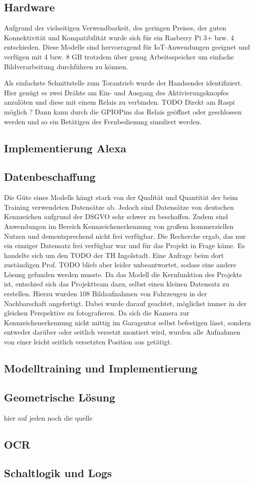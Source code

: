 \subsection{Hardware}
Aufgrund der vielseitigen Verwendbarkeit, des geringen Preises, der guten Konnektivität und Kompatibilität wurde sich für ein Rasberry Pi 3+ bzw. 4 entschieden. Diese Modelle sind hervorragend für IoT-Anwendungen geeignet und verfügen mit 4 bzw. 8 GB trotzdem über genug Arbeitsspeicher um einfache Bildverarbeitung durchführen zu können. 

Als einfachste Schnittstelle zum Torantrieb wurde der Handsender identifiziert. Hier genügt es zwei Drähte am Ein- und Ausgang des Aktivierungsknopfes anzulöten und diese mit einem Relais zu verbinden. TODO Direkt am Raspi möglich ? Dann kann durch die \ac{GPIO}Pins das Relais geöffnet oder geschlossen werden und so ein Betätigen der Fernbedienung simuliert werden.


\subsection{Implementierung Alexa}





\subsection{Datenbeschaffung}
Die Güte eines Modells hängt stark von der Qualität und Quantität der beim Training verwendeten Datensätze ab. Jedoch sind Datensätze von deutschen Kennzeichen aufgrund der \ac{DSGVO} sehr schwer zu beschaffen. Zudem sind Anwendungen im Bereich Kennzeichenerkennung von großem kommerziellen Nutzen und dementsprechend nicht frei verfügbar. Die Recherche ergab, das nur ein einziger Datensatz frei verfügbar war und für das Projekt in Frage käme. Es handelte sich um den TODO der TH Ingolstadt. Eine Anfrage beim dort zuständigen Prof. TODO blieb aber leider unbeantwortet, sodass eine andere Lösung gefunden werden musste.
Da das Modell die Kernfunktion des Projekts ist, entschied sich das Projektteam dazu, selbst einen kleinen Datensatz zu erstellen. 
Hierzu wurden 108 Bildaufnahmen von Fahrzeugen in der Nachbarschaft angefertigt. Dabei wurde darauf geachtet, möglichst immer in der gleichen Perspektive zu fotografieren. Da sich die Kamera zur Kennzeichenerkennung nicht mittig im Garagentor selbst befestigen lässt, sondern entweder darüber oder seitlich versetzt montiert wird, wurden alle Aufnahmen von einer leicht seitlich versetzten Position aus getätigt.

\subsection{Modelltraining und Implementierung}

\subsection{Geometrische Lösung}
hier auf jeden noch die quelle 

\subsection{OCR}

\subsection{Schaltlogik und Logs}

\nocite{*}
